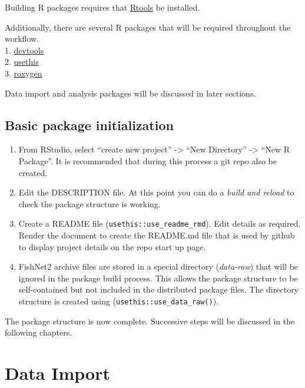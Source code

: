 \documentclass[
]{book}
\providecommand{\tightlist}{%
  \setlength{\itemsep}{0pt}\setlength{\parskip}{0pt}}
\begin{document}
Building R packages requires that \href{https://cran.r-project.org/bin/windows/Rtools/rtools40.html}{Rtools} be installed.

Additionally, there are several R packages that will be required throughout the workflow.\\
1. \href{https://devtools.r-lib.org/}{devtools}\\
2. \href{https://usethis.r-lib.org/}{usethis}\\
3. \href{https://roxygen2.r-lib.org/}{roxygen}

Data import and analysis packages will be discussed in later sections.

\hypertarget{basic-package-initialization}{%
\section{Basic package initialization}\label{basic-package-initialization}}

\begin{enumerate}
\def\labelenumi{\arabic{enumi}.}
\tightlist
\item
  From RStudio, select ``create new project'' -\textgreater{} ``New Directory'' -\textgreater{} ``New R Package''. It is recommended that during this process a git repo also be created.\\
\item
  Edit the DESCRIPTION file. At this point you can do a \emph{build and reload} to check the package structure is working.\\
\item
  Create a README file (\texttt{usethis::use\_readme\_rmd}). Edit details as required. Render the document to create the README.md file that is used by github to display project details on the repo start up page.\\
\item
  FishNet2 archive files are stored in a special directory (\emph{data-raw}) that will be ignored in the package build process. This allows the package structure to be self-contained but not included in the distributed package files. The directory structure is created using (\texttt{usethis::use\_data\_raw()}).
\end{enumerate}

The package structure is now complete. Successive steps will be discussed in the following chapters.

\hypertarget{data-import}{%
\chapter{Data Import}\label{data-import}}
\end{document}
